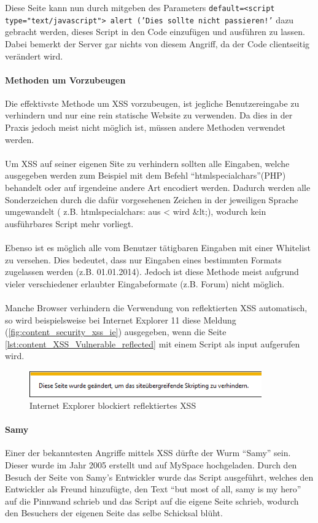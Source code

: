 Diese Seite kann nun durch mitgeben des Parameters  \texttt{default=<script type="text/javascript"> alert ('Dies sollte nicht passieren!'} dazu gebracht werden, dieses Script in den Code einzufügen und ausführen zu lassen. Dabei bemerkt der Server gar nichts von diesem Angriff, da der Code clientseitig verändert wird. 

\paragraph{Methoden um Vorzubeugen}
Die effektivste Methode um XSS vorzubeugen, ist jegliche Benutzereingabe zu verhindern und nur eine rein statische Website zu verwenden. Da dies in der Praxis jedoch meist nicht möglich ist, müssen andere Methoden verwendet werden.\\\\ 
Um XSS auf seiner eigenen Site zu verhindern sollten alle Eingaben, welche ausgegeben werden zum Beispiel mit dem Befehl \enquote{htmlspecialchars}(PHP) behandelt oder auf irgendeine andere Art encodiert werden. Dadurch werden alle Sonderzeichen durch die dafür vorgesehenen Zeichen in der jeweiligen Sprache umgewandelt ( z.B. htmlspecialchars: aus < wird \&lt;), wodurch kein ausführbares Script mehr vorliegt.\\\\
Ebenso ist es möglich alle vom Benutzer tätigbaren Eingaben mit einer Whitelist zu versehen. Dies bedeutet, dass nur Eingaben eines bestimmten Formats zugelassen werden (z.B. 01.01.2014). Jedoch ist diese Methode meist aufgrund vieler verschiedener erlaubter Eingabeformate (z.B. Forum) nicht möglich.\\\\
Manche Browser verhindern die Verwendung von reflektierten XSS automatisch, so wird beispielsweise bei Internet Explorer 11 diese Meldung (\autoref{fig:content_security_xss_ie}) ausgegeben, wenn die Seite \autoref{lst:content_XSS_Vulnerable_reflected} mit einem Script als input aufgerufen wird.

\begin{figure}[H]
\centering
\includegraphics[keepaspectratio=true, width=10cm]{images/screenshots/xss_ie.png}
\caption{Internet Explorer blockiert reflektiertes XSS}
\label{fig:content_security_xss_ie}
\end{figure}

\paragraph{Samy}
Einer der bekanntesten Angriffe mittels XSS dürfte der Wurm \enquote{Samy} sein. Dieser wurde im Jahr 2005 erstellt und auf MySpace hochgeladen. Durch den Besuch der Seite von Samy's Entwickler wurde das Script ausgeführt, welches den Entwickler als Freund hinzufügte, den Text \enquote{but most of all, samy is my hero} auf die Pinnwand schrieb und das Script auf die eigene Seite schrieb, wodurch den Besuchers der eigenen Seite das selbe Schicksal blüht.
